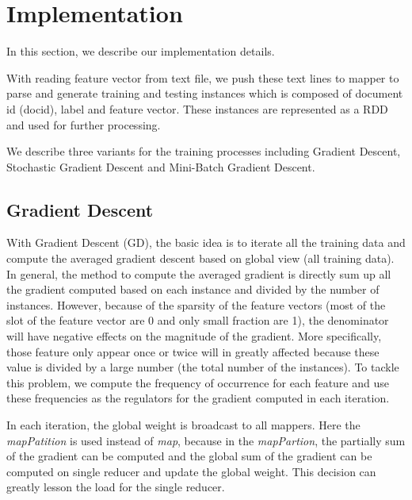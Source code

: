 \documentclass[sigconf]{acmart}
\begin{document}
\section{Implementation}
\label{sec:implementation}

In this section, we describe our implementation details. 

With reading feature vector from text file, we push these text lines to mapper to parse and generate training and testing instances which is composed of document id (docid), label and feature vector. These instances are represented as a RDD and used for further processing. 

We describe three variants for the training processes including Gradient Descent, Stochastic Gradient Descent and Mini-Batch Gradient Descent.

\subsection{Gradient Descent}
\label{sec:implementationGD}

With Gradient Descent (GD), the basic idea is to iterate all the training data and compute the averaged gradient descent based on global view (all training data). In general, the method to compute the averaged gradient is directly sum up all the gradient computed based on each instance and divided by the number of instances. However, because of the sparsity of the feature vectors (most of the slot of the feature vector are 0 and only small fraction are 1), the denominator will have negative effects on the magnitude of the gradient. More specifically, those feature only appear once or twice will in greatly affected because these value is divided by a large number (the total number of the instances). To tackle this problem, we compute the frequency of occurrence for each feature and use these frequencies as the regulators for the gradient computed in each iteration.

In each iteration, the global weight is broadcast to all mappers. Here the \textit{mapPatition} is used instead of \textit{map}, because in the \textit{mapPartion}, the partially sum of the gradient can be computed and the global sum of the gradient can be computed on single reducer and update the global weight. This decision can greatly lesson the load for the single reducer.
\end{document}
